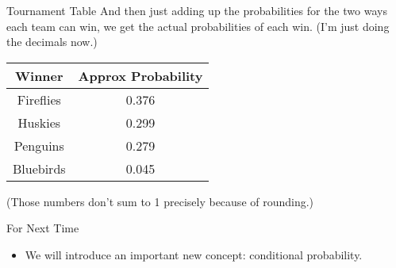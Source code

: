 \documentclass[
  ignorenonframetext,
]{beamer}
\providecommand{\tightlist}{%
  \setlength{\itemsep}{0pt}\setlength{\parskip}{0pt}}
\renewcommand{\,}{\text{, }}
\begin{document}
\begin{frame}{Tournament Table}
\protect\hypertarget{tournament-table-2}{}
And then just adding up the probabilities for the two ways each team can
win, we get the actual probabilities of each win. (I'm just doing the
decimals now.)

\begin{longtable}[]{@{}cc@{}}
\toprule
Winner & Approx Probability \\
\midrule
\endhead
Fireflies & 0.376 \\
Huskies & 0.299 \\
Penguins & 0.279 \\
Bluebirds & 0.045 \\
\bottomrule
\end{longtable}

(Those numbers don't sum to 1 precisely because of rounding.)
\end{frame}

\begin{frame}{For Next Time}
\protect\hypertarget{for-next-time}{}
\begin{itemize}
\tightlist
\item
  We will introduce an important new concept: conditional probability.
\end{itemize}
\end{frame}
\end{document}
